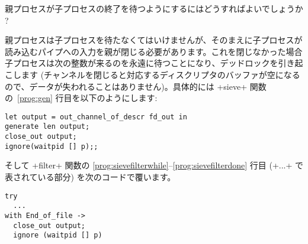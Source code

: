 \begin{exercise}
親プロセスが子プロセスの終了を待つようにするにはどうすればよいでしょうか ?
\end{exercise}
\begin{answer}
親プロセスは子プロセスを待たなくてはいけませんが、そのまえに子プロセスが読み込むパイプへの入力を親が閉じる必要があります。これを閉じなかった場合子プロセスは次の整数が来るのを永遠に待つことになり、デッドロックを引き起こします (チャンネルを閉じると対応するディスクリプタのバッファが空になるので、データが失われることはありません)。具体的には \ml+sieve+ 関数の~\ref{prog:gen} 行目を以下のようにします:
\begin{lstlisting}
let output = out_channel_of_descr fd_out in
generate len output;
close_out output;
ignore(waitpid [] p);;
\end{lstlisting}
そして \ml+filter+ 関数の \ref{prog:sievefilterwhile}--\ref{prog:sievefilterdone} 行目 (\ml+...+ で表されている部分) を次のコードで覆います。
\begin{lstlisting}
try
  ...
with End_of_file ->
  close_out output;
  ignore (waitpid [] p)
\end{lstlisting}
\end{answer}

